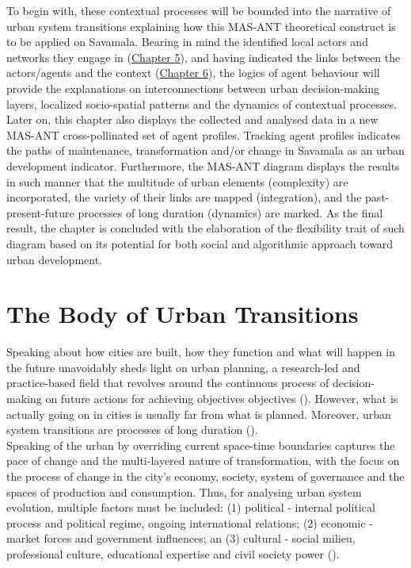 \documentclass[11pt]{report}
\begin{document}
To begin with, these contextual processes will be bounded into the narrative of urban system transitions explaining how this MAS-ANT theoretical construct is to be applied on Savamala.
Bearing in mind the identified local actors and networks they engage in (\href{Chapter 5}{Chapter 5}), and having indicated the links between the actors/agents and the context (\href{Chapter 6}{Chapter 6}), the logics of agent behaviour will provide the explanations on interconnections between urban decision-making layers, localized socio-spatial patterns and the dynamics of contextual processes.
Later on, this chapter also displays the collected and analysed data in a new MAS-ANT cross-pollinated set of agent profiles.
Tracking agent profiles indicates the paths of maintenance, transformation and/or change in Savamala as an urban development indicator.
Furthermore, the MAS-ANT diagram displays the results in such manner that the multitude of urban elements (complexity) are incorporated, the variety of their links are mapped (integration), and the past-present-future processes of long duration (dynamics) are marked.
As the final result, the chapter is concluded with the elaboration of the flexibility trait of such diagram based on its potential for both social and algorithmic approach toward urban development.

\section{The Body of Urban Transitions}

Speaking about how cities are built, how they function and what will happen in the future unavoidably sheds light on urban planning, a research-led and practice-based field that revolves around the continuous process of decision-making on future actions for achieving objectives objectives (\href{Stojkov}{\cite{stojkov_teorijska_2012}}).
However, what is actually going on in cities is usually far from what is planned.
Moreover, urban system transitions are processes of long duration (\href{Braudel}{\cite{braudel_history_1970}}).
\\

Speaking of the urban by overriding current space-time boundaries captures the pace of change and the multi-layered nature of transformation, with the focus on the process of change in the city's economy, society, system of governance and the spaces of production and consumption.
Thus, for analysing urban system evolution, multiple factors must be included:
(1) political - internal political process and political regime, ongoing international relations;
(2) economic - market forces and government influences; 
an
(3) cultural - social milieu, professional  culture, educational  expertise and civil society power (\href{NedovicBudic}{\cite{nedovicbudic_waves_2006}}).
\\
\end{document}
